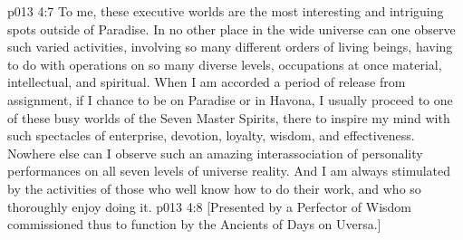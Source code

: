 \vs p013 4:7 To me, these executive worlds are the most interesting and intriguing spots outside of Paradise. In no other place in the wide universe can one observe such varied activities, involving so many different orders of living beings, having to do with operations on so many diverse levels, occupations at once material, intellectual, and spiritual. When I am accorded a period of release from assignment, if I chance to be on Paradise or in Havona, I usually proceed to one of these busy worlds of the Seven Master Spirits, there to inspire my mind with such spectacles of enterprise, devotion, loyalty, wisdom, and effectiveness. Nowhere else can I observe such an amazing interassociation of personality performances on all seven levels of universe reality. And I am always stimulated by the activities of those who well know how to do their work, and who so thoroughly enjoy doing it.
\vsetoff
\vs p013 4:8 [Presented by a Perfector of Wisdom commissioned thus to function by the Ancients of Days on Uversa.]
\quizlink

